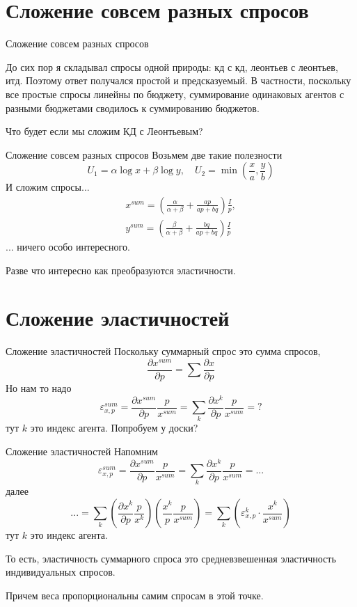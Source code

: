\documentclass{beamer}
\begin{document}
\section{Сложение совсем разных спросов}

\begin{frame}{Сложение совсем разных спросов}

До сих пор я складывал спросы одной природы: кд с кд, леонтьев с леонтьев, итд. Поэтому ответ получался простой и предсказуемый. В частности, поскольку все простые спросы линейны по бюджету, суммирование одинаковых агентов с разными бюджетами сводилось к суммированию бюджетов.

Что будет если мы сложим КД с Леонтьевым?
\end{frame}

\begin{frame}{Сложение совсем разных спросов}
Возьмем две такие полезности
$$ U_1 = \alpha \log x + \beta \log y, \quad U_2 = \min(\frac{x}{a},\frac{y}{b})$$
И сложим спросы...
\begin{gather*}x^{sum} =(\frac{\alpha}{\alpha+\beta} + \frac{ap}{ap+bq})\frac{I}{p},\\ y^{sum} =(\frac{\beta}{\alpha+\beta} + \frac{bq}{ap+bq})\frac{I}{p}\end{gather*}
... ничего особо интересного.

Разве что интересно как преобразуются эластичности.
\end{frame}

\section{Сложение эластичностей}

\begin{frame}{Сложение эластичностей}
Поскольку суммарный спрос это сумма спросов,
$$ \frac{\partial x^{sum}}{\partial p} = \sum \frac{\partial x}{\partial p}$$
Но нам то надо
$$ \varepsilon_{x,p}^{sum} = \frac{\partial x^{sum}}{\partial p} \frac{p}{x^{sum}}= \sum_k \frac{\partial x^k}{\partial p}\frac{p}{x^{sum}} = ?$$
тут $k$ это индекс агента. Попробуем у доски?
\end{frame}

\begin{frame}{Сложение эластичностей}
Напомним
$$ \varepsilon_{x,p}^{sum} = \frac{\partial x^{sum}}{\partial p} \frac{p}{x^{sum}}= \sum_k \frac{\partial x^k}{\partial p}\frac{p}{x^{sum}} = ...$$
далее
$$ ... = \sum_k (\frac{\partial x^k}{\partial p}\frac{p}{x^k})(\frac{x^k}{p}\frac{p}{x^{sum}}) = \sum_k (\varepsilon^k_{x,p} \cdot \frac{x^k}{x^{sum}})$$
тут $k$ это индекс агента.

То есть, \alert{эластичность суммарного спроса это средневзвешенная эластичность индивидуальных спросов}. 

Причем веса пропорциональны самим спросам в этой точке.
\end{frame}
\end{document}
